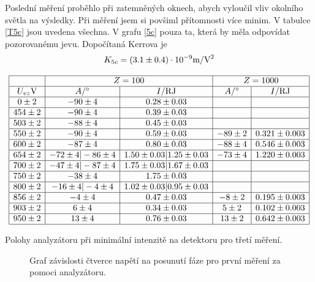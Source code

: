 \documentclass[a4paper,12pt]{article}
\begin{document}
Poslední měření proběhlo při zatemněných oknech, abych vyloučil vliv 
okolního světla na výsledky. Při měření jsem si povšiml přítomnosti 
více minim. V tabulce \ref{T5c} jsou uvedena všechna. V grafu \ref{5c} pouza 
ta, která by měla odpovídat pozorovanému jevu. Dopočítaná Kerrova je
\begin{eqnarray}
K_{5c}=(3.1\pm0.4) \cdot 10^{-9} \mbox{m}/\mbox{V}^2
\end{eqnarray}

\begin{table}
$$
\begin{array}{|c|c|c|c|c|}
\hline
&   \multicolumn{2}{c|}{Z=100}& \multicolumn{2}{c|}{Z=1000} \\ \hline
U_{vz}\mbox{V}& A/\st&  I/\RJ&  A/\st&  I/\RJ   \\ \hline
0 \pm 2 &   -90 \pm 4&  0.28\pm 0.03& &  \\ \hline
454 \pm 2 &   -90 \pm 4& 0.39 \pm 0.03& & \\ \hline
503 \pm 2 &   -88 \pm 4& 0.45 \pm 0.03& & \\ \hline
550 \pm 2 &   -90 \pm 4& 0.59 \pm 0.03& -89 \pm 2 & 0.321 \pm 0.003  \\ \hline
600 \pm 2 &   -87 \pm 4& 0.80 \pm 0.03& -88 \pm 4 & 0.546 \pm 0.003 \\ \hline
654 \pm 2 &   -72 \pm 4|-86 \pm 4&1.50\pm0.03|1.25 \pm 0.03& -73 \pm 4& 1.220 \pm 0.003 \\ \hline
700 \pm 2 &   -47 \pm 4|-87 \pm 4&1.75\pm0.03|1.67 \pm 0.03& & \\ \hline
750 \pm 2 &   -38 \pm 4& 1.75\pm 0.03& &  \\ \hline
800 \pm 2 &   -16 \pm 4|-4 \pm 4& 1.02\pm0.03|0.95 \pm 0.03& & \\ \hline
856 \pm 2 &   -4 \pm 4& 0.47\pm0.03& -8\pm 2&0.195 \pm 0.003 \\ \hline
903 \pm 2 &   6 \pm 4& 0.34\pm0.03& 5\pm 2&0.102 \pm 0.003 \\ \hline
950 \pm 2 &   13 \pm 4& 0.76\pm0.03& 13\pm 2&0.642 \pm 0.003 \\ \hline
\end{array}
$$
\caption{Polohy analyzátoru při minimální intenzitě na detektoru pro třetí měření.}
\label{T5c}
\end{table}

\begin{figure}
\begin{center}

\end{center}
\caption{Graf závislosti čtverce napětí na posunutí fáze pro první měření za pomoci analyzátoru.}
\label{5a}
\end{figure}
\end{document}
